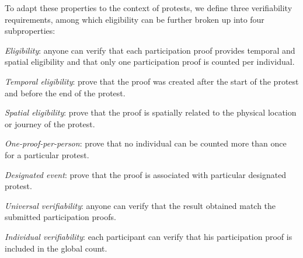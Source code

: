 To adapt these properties to the context of protests, we define three 
verifiability requirements, among which eligibility can be further broken up 
into four subproperties:
\begin{requirements}[V]
  \item\label{EligibilityVerif} \emph{Eligibility}: anyone can verify that each participation proof provides temporal and spatial eligibility and that only one participation proof is counted per individual.
    \begin{requirements}
    \item\label{TemporallyRelated} \emph{Temporal eligibility}: prove that the proof was created after the start of the protest and before the end of the protest.
    \item\label{SpatiallyRelated} \emph{Spatial eligibility}: prove that the proof is spatially related to the physical location or journey of the protest.
    \item\label{CountOnce} \emph{One-proof-per-person}: prove that no individual can be counted more than once for a particular protest.
    \item\label{DesignatedEvent} \emph{Designated event}: prove that the proof is associated with particular designated protest.
    \end{requirements}

  \item\label{UniversalVerif} \emph{Universal verifiability}: anyone can verify that the result obtained match the submitted participation proofs.

  \item\label{IndividualVerif} \emph{Individual verifiability}: each participant can verify that his participation proof is included in the global count.
\end{requirements}

